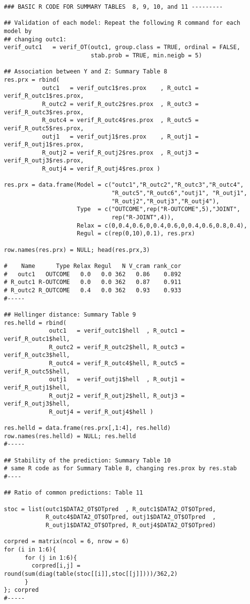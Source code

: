 \begin{verbatim}
### BASIC R CODE FOR SUMMARY TABLES  8, 9, 10, and 11 ---------

## Validation of each model: Repeat the following R command for each model by
## changing outc1:
verif_outc1   = verif_OT(outc1, group.class = TRUE, ordinal = FALSE, 
                         stab.prob = TRUE, min.neigb = 5)

## Association between Y and Z: Summary Table 8
res.prx = rbind(
           outc1   = verif_outc1$res.prox    , R_outc1 = verif_R_outc1$res.prox, 
           R_outc2 = verif_R_outc2$res.prox  , R_outc3 = verif_R_outc3$res.prox,
           R_outc4 = verif_R_outc4$res.prox  , R_outc5 = verif_R_outc5$res.prox,
           outj1   = verif_outj1$res.prox    , R_outj1 = verif_R_outj1$res.prox,
           R_outj2 = verif_R_outj2$res.prox  , R_outj3 = verif_R_outj3$res.prox,
           R_outj4 = verif_R_outj4$res.prox )
                                
res.prx = data.frame(Model = c("outc1","R_outc2","R_outc3","R_outc4",
                               "R_outc5","R_outc6","outj1", "R_outj1",
                               "R_outj2","R_outj3","R_outj4"), 
                     Type  = c("OUTCOME",rep("R-OUTCOME",5),"JOINT",
                               rep("R-JOINT",4)),
                     Relax = c(0,0.4,0.6,0,0.4,0.6,0,0.4,0.6,0.8,0.4), 
                     Regul = c(rep(0,10),0.1), res.prx)

row.names(res.prx) = NULL; head(res.prx,3)

#    Name      Type Relax Regul   N V_cram rank_cor
#   outc1   OUTCOME   0.0   0.0 362   0.86    0.892
# R_outc1 R-OUTCOME   0.0   0.0 362   0.87    0.911
# R_outc2 R_OUTCOME   0.4   0.0 362   0.93    0.933
#-----

## Hellinger distance: Summary Table 9
res.helld = rbind(
             outc1   = verif_outc1$hell  , R_outc1 = verif_R_outc1$hell,
             R_outc2 = verif_R_outc2$hell, R_outc3 = verif_R_outc3$hell, 
             R_outc4 = verif_R_outc4$hell, R_outc5 = verif_R_outc5$hell, 
             outj1   = verif_outj1$hell  , R_outj1 = verif_R_outj1$hell,
             R_outj2 = verif_R_outj2$hell, R_outj3 = verif_R_outj3$hell,
             R_outj4 = verif_R_outj4$hell )

res.helld = data.frame(res.prx[,1:4], res.helld)
row.names(res.helld) = NULL; res.helld
#-----

## Stability of the prediction: Summary Table 10 
# same R code as for Summary Table 8, changing res.prox by res.stab
#----

## Ratio of common predictions: Table 11

stoc = list(outc1$DATA2_OT$OTpred  , R_outc1$DATA2_OT$OTpred,
            R_outc4$DATA2_OT$OTpred, outj1$DATA2_OT$OTpred  ,
            R_outj1$DATA2_OT$OTpred, R_outj4$DATA2_OT$OTpred)

corpred = matrix(ncol = 6, nrow = 6)
for (i in 1:6){
      for (j in 1:6){
        corpred[i,j] = round(sum(diag(table(stoc[[i]],stoc[[j]])))/362,2)
      }
}; corpred
#-----
\end{verbatim}

